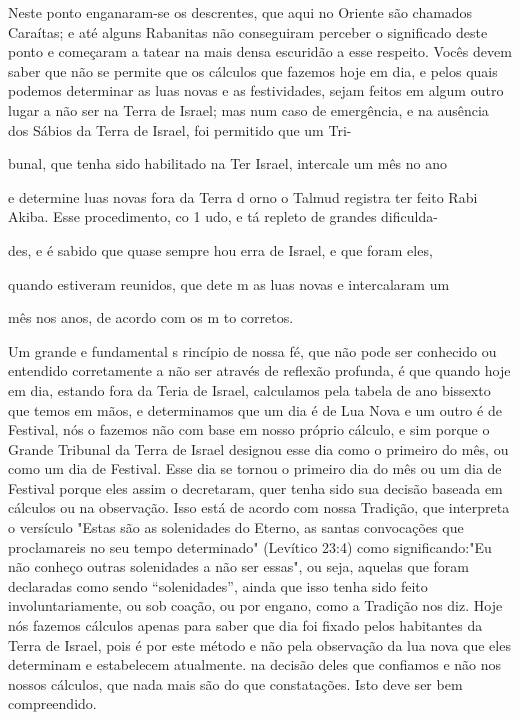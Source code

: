 Neste ponto enganaram-se os descrentes, que aqui no Oriente são chamados
Caraítas; e até alguns Rabanitas não conseguiram perceber o signifi­cado
deste ponto e começaram a tatear na mais densa escuridão a esse
respeito. Vocês devem saber que não se permite que os cálculos que
fazemos hoje em dia, e pelos quais podemos determinar as luas novas e as
festividades, sejam feitos em algum outro lugar a não ser na Terra de
Israel; mas num caso de emer­gência, e na ausência dos Sábios da Terra
de Israel, foi permitido que um Tri-

bunal, que tenha sido habilitado na Ter Israel, intercale um mês no ano

e determine luas novas fora da Terra d orno o Talmud registra ter feito
 Rabi Akiba. Esse procedimento, co 1 udo, e tá repleto de grandes
 dificulda-


des, e é sabido que quase sempre hou erra de Israel, e que foram eles,

quando estiveram reunidos, que dete m as luas novas e intercalaram um

mês nos anos, de acordo com os m to corretos.

Um grande e fundamental s rincípio de nossa fé, que não pode ser
conhecido ou entendido corretamente a não ser através de reflexão
profunda, é que quando hoje em dia, estando fora da Teria de Israel,
calculamos pela ta­bela de ano bissexto que temos em mãos, e
determinamos que um dia é de Lua Nova e um outro é de Festival, nós o
fazemos não com base em nosso próprio cálculo, e sim porque o Grande
Tribunal da Terra de Israel designou esse dia como o primeiro do mês, ou
como um dia de Festival. Esse dia se tornou o primeiro dia do mês ou um
dia de Festival porque eles assim o decretaram, quer tenha sido sua
decisão baseada em cálculos ou na observação. Isso está de acordo com
nossa Tradição, que interpreta o versículo "Estas são as solenidades do
Eterno, as santas convocações que proclamareis no seu tempo determinado"
(Levítico 23:4) como significando:"Eu não conheço outras solenidades a
não ser essas", ou seja, aquelas que foram declaradas como sendo
``solenidades'', ainda que isso tenha sido feito involuntariamente, ou sob
coação, ou por enga­no, como a Tradição nos diz. Hoje nós fazemos
cálculos apenas para saber que dia foi fixado pelos habitantes da Terra
de Israel, pois é por este método e não pela observação da lua nova que
eles determinam e estabelecem atualmente.
 na decisão deles que confiamos e não nos nossos cálculos, que nada
 mais são do que constatações. Isto deve ser bem compreendido.


